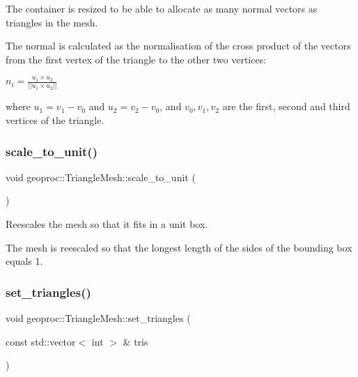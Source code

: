The container is resized to be able to allocate as many normal vectors as triangles in the mesh.

The normal is calculated as the normalisation of the cross product of the vectors from the first vertex of the triangle to the other two vertices\+:

$ n_i = \frac{ u_1 \times u_2 }{ || u_1 \times u_2 || } $

where $ u_1 = v_1 - v_0 $ and $ u_2 = v_2 - v_0 $, and $v_0,v_1,v_2$ are the first, second and third vertices of the triangle. \mbox{\label{classgeoproc_1_1TriangleMesh_a2b34ddfa21f906805451e6dbbb4ce064}} 
\subsubsection{\texorpdfstring{scale\+\_\+to\+\_\+unit()}{scale\_to\_unit()}}
{\footnotesize\ttfamily void geoproc\+::\+Triangle\+Mesh\+::scale\+\_\+to\+\_\+unit (\begin{DoxyParamCaption}{ }\end{DoxyParamCaption})}



Reescales the mesh so that it fits in a unit box. 

The mesh is reescaled so that the longest length of the sides of the bounding box equals 1. \mbox{\label{classgeoproc_1_1TriangleMesh_a5e35cad5c18195e6397f22bc951161f1}} 
\subsubsection{\texorpdfstring{set\+\_\+triangles()}{set\_triangles()}}
{\footnotesize\ttfamily void geoproc\+::\+Triangle\+Mesh\+::set\+\_\+triangles (\begin{DoxyParamCaption}\item[{const std\+::vector$<$ int $>$ \&}]{tris }\end{DoxyParamCaption})}



